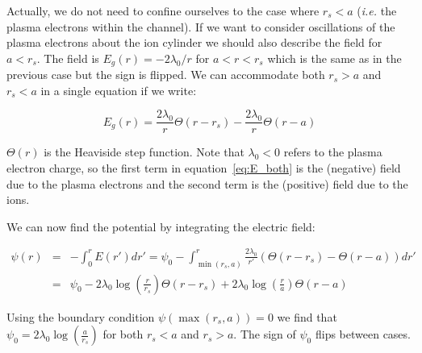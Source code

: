 \documentclass[aps,prl,preprint,groupedaddress]{revtex4-1}
\begin{document}
Actually, we do not need to confine ourselves to the case where $r_s < a$ (\emph{i.e.} the plasma electrons within the channel). If we want to consider oscillations of the plasma electrons about the ion cylinder we should also describe the field for $a <  r_s$. The field is $E_g(r) = -2\lambda_0/r$ for $a < r < r_s$  which is the same as in the previous case but the sign is flipped. We can accommodate both $r_s > a$ and $r_s < a$ in a single equation if we write:

\begin{equation}\label{eq:E_both}
E_g(r) = \frac{2\lambda_0}{r}\Theta(r-r_s) - \frac{2\lambda_0}{r}\Theta(r-a)
\end{equation}

$\Theta(r)$ is the Heaviside step function. Note that $\lambda_0 < 0$ refers to the plasma electron charge, so the first term in equation~\ref{eq:E_both} is the (negative) field due to the plasma electrons and the second term is the (positive) field due to the ions.

We can now find the potential by integrating the electric field:

\begin{equation}\label{eq:Psi_both}
\begin{array}{rcl}
\psi(r) & = & -\int_0^r E(r') dr' = \psi_0 - \int_{\min(r_s,a)}^r \frac{2\lambda_0}{r'}\left(\Theta(r-r_s) - \Theta(r-a)\right) dr' \\
& = & \psi_0 - 2\lambda_0\log\left(\frac{r}{r_s}\right)\Theta(r-r_s) + 2\lambda_0\log\left(\frac{r}{a}\right)\Theta(r-a)
\end{array}
\end{equation}

Using the boundary condition $\psi(\max(r_s,a)) = 0$ we find that $\psi_0 = 2\lambda_0 \log\left(\frac{a}{r_s}\right)$ for both $r_s < a$ and $r_s > a$. The sign of $\psi_0$ flips between cases. 

\end{document}
